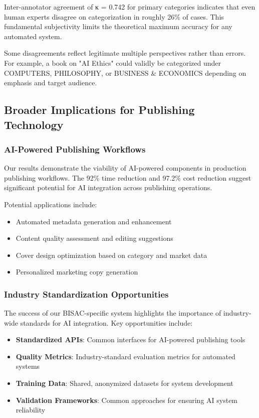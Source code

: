 \documentclass{article}
\begin{document}
Inter-annotator agreement of κ = 0.742 for primary categories indicates that even human experts disagree on categorization in roughly 26\% of cases. This fundamental subjectivity limits the theoretical maximum accuracy for any automated system.

Some disagreements reflect legitimate multiple perspectives rather than errors. For example, a book on "AI Ethics" could validly be categorized under COMPUTERS, PHILOSOPHY, or BUSINESS \& ECONOMICS depending on emphasis and target audience.

\subsection{Broader Implications for Publishing Technology}

\subsubsection{AI-Powered Publishing Workflows}

Our results demonstrate the viability of AI-powered components in production publishing workflows. The 92\% time reduction and 97.2\% cost reduction suggest significant potential for AI integration across publishing operations.

Potential applications include:
\begin{itemize}
\item Automated metadata generation and enhancement
\item Content quality assessment and editing suggestions
\item Cover design optimization based on category and market data
\item Personalized marketing copy generation
\end{itemize}

\subsubsection{Industry Standardization Opportunities}

The success of our BISAC-specific system highlights the importance of industry-wide standards for AI integration. Key opportunities include:

\begin{itemize}
\item \textbf{Standardized APIs}: Common interfaces for AI-powered publishing tools
\item \textbf{Quality Metrics}: Industry-standard evaluation metrics for automated systems
\item \textbf{Training Data}: Shared, anonymized datasets for system development
\item \textbf{Validation Frameworks}: Common approaches for ensuring AI system reliability
\end{itemize}
\end{document}
